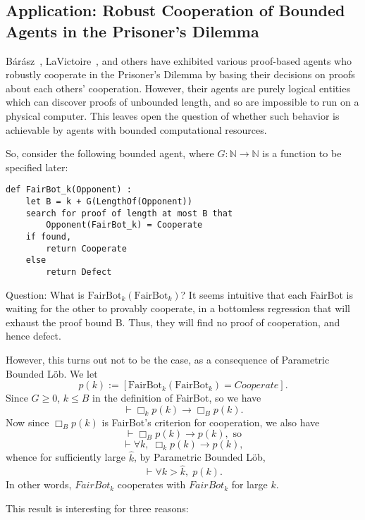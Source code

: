 \documentclass[jsl,reqno,bibay2]{asl}
\numberwithin{equation}{section}
\theoremstyle{definition}
\newcommand{\NN}{\mathbb{N}}
\newcommand{\proves}[1]{\underset{#1}{\vdash}}
\newcommand{\bx}[1]{\Box_{#1}}
\renewcommand{\implies}{\rightarrow}
\renewcommand{\to}{\rightarrow}
\renewcommand{\-}{^{-1}}
\newcommand{\FB}{\mathrm{FairBot}}
\begin{document}
\subsection{Application: Robust Cooperation of Bounded Agents in the Prisoner's Dilemma}
\label{sec:robucoop}

B\'{a}r\'{a}sz~\citeyear{Barasz:2014:robust}, LaVictoire~\citeyear{LaVictoire:2014:program}, and others have exhibited various proof-based agents who robustly cooperate in the Prisoner's Dilemma by basing their decisions on proofs about each others' cooperation.  However, their agents are purely logical entities which can discover proofs of unbounded length, and so are impossible to run on a physical computer.  This leaves open the question of whether such behavior is achievable by agents with bounded computational resources.

So, consider the following bounded agent, where $G:\NN\to\NN$ is a function to be specified later:

\begin{Verbatim}[frame=single]
def FairBot_k(Opponent) :
	let B = k + G(LengthOf(Opponent))
	search for proof of length at most B that 
		Opponent(FairBot_k) = Cooperate
	if found,
		return Cooperate
	else
		return Defect
\end{Verbatim}

Question: What is $\FB_k(\FB_k)$?  It seems intuitive that each FairBot is waiting for the other to provably cooperate, in a bottomless regression that will exhaust the proof bound B.  Thus, they will find no proof of cooperation, and hence defect.  

However, this turns out not to be the case, as a consequence of Parametric Bounded L\"{o}b.  We let $$p(k) := [\FB_k(\FB_k) = Cooperate].$$
Since $G\geq 0$, $k \leq B$ in the definition of FairBot, so we have 
$$\proves{} \bx{k}p(k) \implies \bx{B}p(k).$$
Now since $\bx{B}p(k)$ is FairBot's criterion for cooperation, we also have 
$$\proves{} \bx{B}p(k) \implies p(k), \textrm{ \ so}$$ 
$$\proves{} \forall k, \; \bx{k} p(k) \implies p(k),$$
whence for sufficiently large $\hat k$, by Parametric Bounded L\"{o}b,
$$\proves{} \forall k>\hat k,\; p(k).$$
In other words, $FairBot_k$ cooperates with $FairBot_k$ for large $k$.  

This result is interesting for three reasons:
\end{document}

